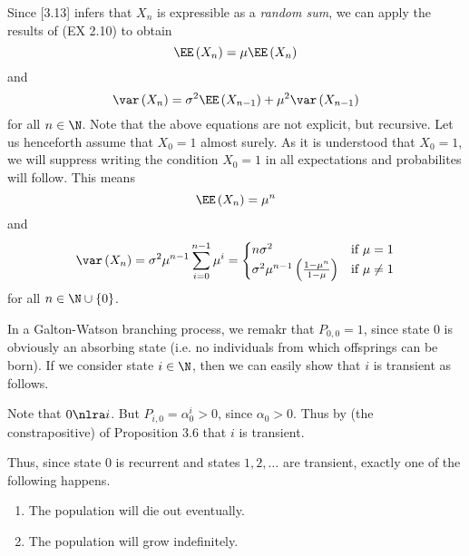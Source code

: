 \documentclass[stat333]{subfiles}
\begin{document}
    Since [3.13] infers that $X_n$ is expressible as a \textit{random sum}, we can apply the results of (EX 2.10) to obtain
    \begin{equation*}
        \EE\left( X_n \right) = \mu\EE\left( X_n \right)
    \end{equation*}
    and
    \begin{equation*}
        \var\left( X_n \right)=\sigma^{2}\EE\left( X_{n-1} \right)+\mu^{2}\var\left( X_{n-1} \right)
    \end{equation*}
    for all $n\in\N$. Note that the above equations are not explicit, but recursive. Let us henceforth assume that $X_0=1$ almost surely. As it is understood that $X_0=1$, we will suppress writing the condition $X_0=1$ in all expectations and probabilites will follow. This means
    \begin{equation*}
        \EE\left( X_n \right) = \mu^n
    \end{equation*}
    and 
    \begin{equation*}
        \var\left( X_n \right) = \sigma^{2}\mu^{n-1} \sum^{n-1}_{i=0}\mu^i =
        \begin{cases} 
            n\sigma^{2} & \text{if $\mu=1$}\\
            \sigma^{2}\mu^{n-1} \left( \frac{1-\mu^n}{1-\mu} \right) & \text{if $\mu\neq 1$}
        \end{cases}
    \end{equation*}
    for all $n\in\N\cup\left\lbrace 0 \right\rbrace$.

    In a Galton-Watson branching process, we remakr that $P_{0,0}=1$, since state $0$ is obviously an absorbing state (i.e. no individuals from which offsprings can be born). If we consider state $i\in\N$, then we can easily show that $i$ is transient as follows.

    \begin{subproof}
        Note that $0\nlra i$. But $P_{i,0} = \alpha_0^i > 0$, since $\alpha_0>0$. Thus by (the constrapositive) of Proposition 3.6 that $i$ is transient.
    \end{subproof}

    \noindent Thus, since state 0 is recurrent and states $1,2,\ldots$ are transient, exactly one of the following happens.
    \begin{enumerate}
        \item The population will die out eventually.
        \item The population will grow indefinitely.
    \end{enumerate}
\end{document}
